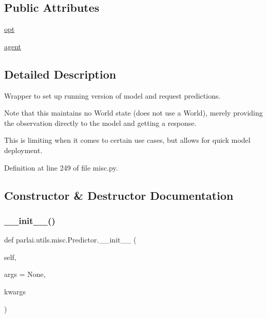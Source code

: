 \subsection*{Public Attributes}
\begin{DoxyCompactItemize}
\item 
\hyperlink{classparlai_1_1utils_1_1misc_1_1Predictor_a608b3d7f6722389f3a7eeed0ec5772b7}{opt}
\item 
\hyperlink{classparlai_1_1utils_1_1misc_1_1Predictor_a0ea35fd562c6edaa6affd03006f1bd08}{agent}
\end{DoxyCompactItemize}


\subsection{Detailed Description}
\begin{DoxyVerb}Wrapper to set up running version of model and request predictions.

Note that this maintains no World state (does not use a World), merely
providing the observation directly to the model and getting a response.

This is limiting when it comes to certain use cases, but allows for quick
model deployment.
\end{DoxyVerb}
 

Definition at line 249 of file misc.\+py.



\subsection{Constructor \& Destructor Documentation}
\mbox{\label{classparlai_1_1utils_1_1misc_1_1Predictor_a40aaf55870ba3c02fc2bff2ef5d2a9b7}} 
\subsubsection{\texorpdfstring{\+\_\+\+\_\+init\+\_\+\+\_\+()}{\_\_init\_\_()}}
{\footnotesize\ttfamily def parlai.\+utils.\+misc.\+Predictor.\+\_\+\+\_\+init\+\_\+\+\_\+ (\begin{DoxyParamCaption}\item[{}]{self,  }\item[{}]{args = {\ttfamily None},  }\item[{}]{kwargs }\end{DoxyParamCaption})}

